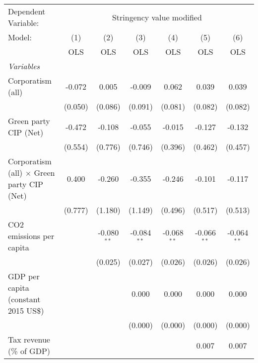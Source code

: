 
\begingroup
\centering
\begin{tabular}{lcccccc}
   \toprule
   Dependent Variable: & \multicolumn{6}{c}{Stringency value modified}\\
   Model:                                            & (1)     & (2)           & (3)           & (4)           & (5)           & (6)\\  
                                                     &  OLS    & OLS           & OLS           & OLS           & OLS           & OLS\\  
   \midrule
   \emph{Variables}\\
   Corporatism (all)                                 & -0.072  & 0.005         & -0.009        & 0.062         & 0.039         & 0.039\\   
                                                     & (0.050) & (0.086)       & (0.091)       & (0.081)       & (0.082)       & (0.082)\\   
   Green party CIP (Net)                             & -0.472  & -0.108        & -0.055        & -0.015        & -0.127        & -0.132\\   
                                                     & (0.554) & (0.776)       & (0.746)       & (0.396)       & (0.462)       & (0.457)\\   
   Corporatism (all) $\times$ Green party CIP (Net)  & 0.400   & -0.260        & -0.355        & -0.246        & -0.101        & -0.117\\   
                                                     & (0.777) & (1.180)       & (1.149)       & (0.496)       & (0.517)       & (0.513)\\   
   CO2 emissions per capita                          &         & -0.080$^{**}$ & -0.084$^{**}$ & -0.068$^{**}$ & -0.066$^{**}$ & -0.064$^{**}$\\   
                                                     &         & (0.025)       & (0.027)       & (0.026)       & (0.026)       & (0.026)\\   
   GDP per capita (constant 2015 US\$)               &         &               & 0.000         & 0.000         & 0.000         & 0.000\\   
                                                     &         &               & (0.000)       & (0.000)       & (0.000)       & (0.000)\\   
   Tax revenue (\% of GDP)                           &         &               &               &               & 0.007         & 0.007\\   

\end{tabular}
